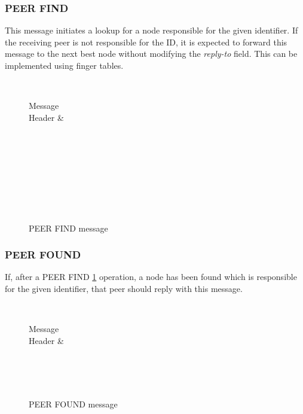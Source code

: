 \documentclass[a4paper, 11pt]{article}
\begin{document}
\subsubsection{PEER FIND}

This message initiates a lookup for a node responsible for the given identifier. If the receiving peer is not responsible for the ID, it is expected to forward this message to the next best node without modifying the \textit{reply-to} field. This can be implemented using finger tables.

\begin{figure}[H]
	\centering
	\begin{bytefield}[bitwidth=0.8em]{32}
		 \\
		\begin{rightwordgroup}{Message \\  Header}
			 & 
		\end{rightwordgroup} \\
		 \\
		\skippedwords \\
		 \\
		 \\
		\skippedwords \\
		 \\
	\end{bytefield}
	\caption{PEER FIND message}
	\label{PEERFIND}
\end{figure}

\subsubsection{PEER FOUND}

If, after a PEER FIND \ref{PEERFIND} operation, a node has been found which is responsible for the given identifier, that peer should reply with this message.

\begin{figure}[H]
	\centering
	\begin{bytefield}[bitwidth=0.8em]{32}
		 \\
		\begin{rightwordgroup}{Message \\  Header}
			 & 
		\end{rightwordgroup} \\
		 \\
		\skippedwords \\
	\end{bytefield}
	\caption{PEER FOUND message}
	\label{PEERFOUND}
\end{figure}
\end{document}
